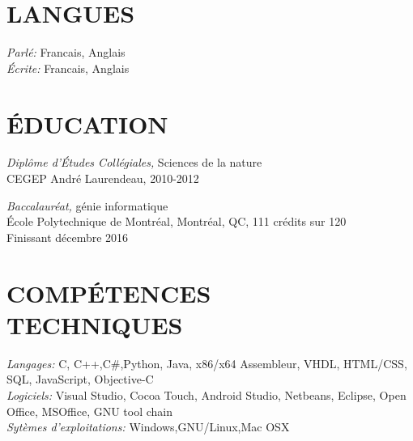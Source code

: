 \documentclass[margin, 10pt]{res} %
\begin{document}
\begin{resume}


\section{LANGUES}

{\sl Parl\'e:} Francais, Anglais \\
{\sl \'Ecrite:} Francais, Anglais


\section{\'EDUCATION}

{\sl Dipl\^ome d'\'Etudes Coll\'egiales,} Sciences de la nature \\
CEGEP Andr\'e Laurendeau, 2010-2012 

{\sl Baccalaur\'eat,} g\'enie informatique \\
\'Ecole Polytechnique de Montr\'eal, Montr\'eal, QC, 111 cr\'edits sur 120\\
Finissant d\'ecembre 2016
 

\section{COMP\'ETENCES\\ TECHNIQUES} 

{\sl Langages:} 
C, C++,C\#,Python, Java, x86/x64 Assembleur, VHDL, HTML/CSS, SQL, JavaScript, Objective-C \\
{\sl Logiciels:} 
Visual Studio, Cocoa Touch, Android Studio, Netbeans, Eclipse, Open Office, MSOffice, GNU tool chain \\
{\sl Syt\`emes d'exploitations:} Windows,GNU/Linux,Mac OSX

 

\end{resume}
\end{document}
